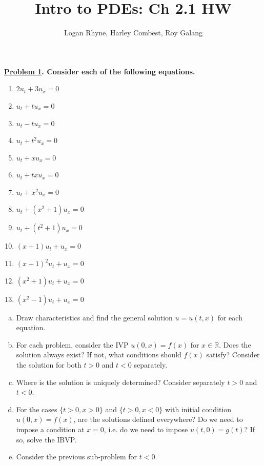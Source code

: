 \documentclass{article}
\title{Intro to PDEs: Ch 2.1 HW}
\author{Logan Rhyne, Harley Combest, Roy Galang}
\theoremstyle{definition}
\newenvironment{boldenv}{\bfseries\boldmath}{}
\newcommand{\R}{\mathbb{R}}
\begin{document}
	
	\maketitle
	
	\begin{boldenv}
		\underline{Problem 1}. Consider each of the following equations.
            \begin{enumerate}[(1), series=problems]
			\item $2u_t + 3u_x = 0$
			\item $u_t + tu_x = 0$
			\item $u_t - tu_x = 0$
			\item $u_t + t^2u_x = 0$
			\item $u_t + xu_x = 0$
			\item $u_t + txu_x = 0$
                \item $u_t + x^2u_x = 0$
			\item $u_t + (x^2+1)u_x = 0$
			\item $u_t + (t^2+1)u_x = 0$
			\item $(x+1)u_t + u_x = 0$
			\item $(x+1)^2u_t + u_x = 0$
            \item $(x^2+1)u_t + u_x = 0$
            \item $(x^2-1)u_t + u_x = 0$
		\end{enumerate}
            \begin{enumerate}[(a), leftmargin=4em]
                \item Draw characteristics and find the general solution $u=u(t,x)$ for each equation.
                \item For each problem, consider the IVP  $u(0,x) = f(x)$ for $x \in \R$. Does the solution always exist? If not, what conditions should $f(x)$ satisfy? Consider the solution for both $t>0$ and $t<0$ separately. 
                \item Where is the solution is uniquely determined? Consider separately $t>0$ and $t<0$.
                \item For the cases $\{ t>0, x>0 \}$ and $\{ t>0, x<0 \}$ with initial condition $u(0,x) = f(x)$, are the solutions defined everywhere?  Do we need to impose a condition at $x=0$, i.e. do we need to impose $u(t,0) = g(t)$? If so, solve the IBVP. 
                \item Consider the previous sub-problem for $t<0$.
            \end{enumerate}
            
                
            \end{boldenv}
\end{document}
